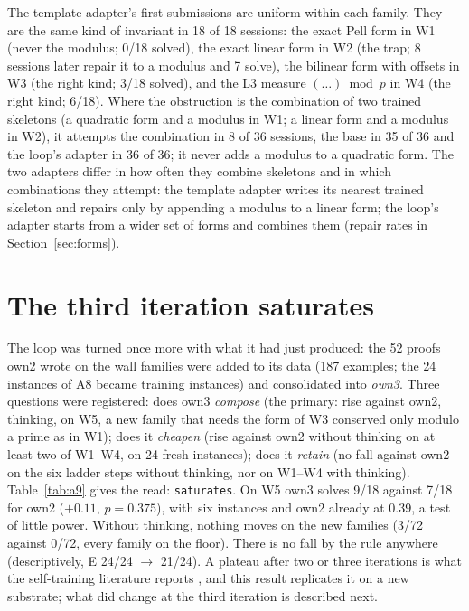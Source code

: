 \documentclass[11pt]{article}
\begin{document}
The template adapter's first submissions are uniform within each family.
They are the same kind of invariant in 18 of 18 sessions: the exact Pell
form in W1 (never the modulus; 0/18 solved), the exact linear form in W2
(the trap; 8 sessions later repair it to a modulus and 7 solve), the
bilinear form with offsets in W3 (the right kind; 3/18 solved), and the
L3 measure $(\ldots)\bmod p$ in W4 (the right kind; 6/18). Where the
obstruction is the combination of two trained skeletons (a quadratic form
and a modulus in W1; a linear form and a modulus in W2), it attempts the
combination in 8 of 36 sessions, the base in 35 of 36 and the loop's
adapter in 36 of 36; it never adds a modulus to a quadratic form. The two
adapters differ in how often they combine skeletons and in which
combinations they attempt: the template adapter writes its nearest
trained skeleton and repairs only by appending a modulus to a linear form;
the loop's adapter starts from a wider set of forms and combines them
(repair rates in Section~\ref{sec:forms}).

\section{The third iteration saturates}
\label{sec:a9}

The loop was turned once more with what it had just produced: the 52
proofs own2 wrote on the wall families were added to its data (187
examples; the 24 instances of A8 became training instances) and
consolidated into \emph{own3}. Three questions were registered: does own3
\emph{compose} (the primary: rise against own2, thinking, on W5, a new
family that needs the form of W3 conserved only modulo a prime as in W1);
does it \emph{cheapen} (rise against own2 without thinking on at least two
of W1--W4, on 24 fresh instances); does it \emph{retain} (no fall against
own2 on the six ladder steps without thinking, nor on W1--W4 with
thinking). Table~\ref{tab:a9} gives the read: \texttt{saturates}. On W5
own3 solves 9/18 against 7/18 for own2 ($+0.11$, $p=0.375$), with six
instances and own2 already at 0.39, a test of little power. Without
thinking, nothing moves on the new families (3/72 against 0/72, every
family on the floor). There is no fall by the rule anywhere
(descriptively, E 24/24 $\to$ 21/24). A plateau after two or three
iterations is what the self-training literature reports
\citep{singh2024restem,zelikman2022star}, and this result replicates it on
a new substrate; what did change at the third iteration is described next.
\end{document}
